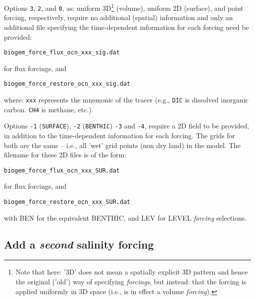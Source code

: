 \documentclass[11pt,fleqn]{book} %
\begin{document}
Options \texttt{3}, \texttt{2}, and \texttt{0}, as: uniform 3D\footnote{Note that here: '3D' does not mean a spatially explicit 3D pattern and hence the original ('old') way of specifying \textit{forcings}, but instead: that the forcing is applied uniformly in 3D space (i.e., is in effect a volume \textit{forcing}).} (volume), uniform 2D (surface), and point forcing, respectively, require no additional (spatial) information and only an additional file specifying the time-dependent information for each forcing need be provided:
\vspace{-2pt}\small\begin{verbatim}
biogem_force_flux_ocn_xxx_sig.dat
\end{verbatim}\normalsize\vspace{-2pt}
for flux forcings, and 
\vspace{-2pt}\small\begin{verbatim}
biogem_force_restore_ocn_xxx_sig.dat
\end{verbatim}\normalsize\vspace{-2pt}
where: \texttt{xxx} represents the mnemonic of the tracer (e.g., \texttt{DIC} is dissolved inorganic carbon. \texttt{CH4} is methane, etc.).

Options \texttt{-1} (\texttt{SURFACE}), \texttt{-2} (\texttt{BENTHIC}) \texttt{-3} and  \texttt{-4}, require a 2D field to be provided, in addition to the time-dependent information for each forcing. The grids for both are the same -- i.e., all 'wet' grid points (non dry land) in the model. The filename for these 2D files is of the form:
\vspace{-2pt}\small\begin{verbatim}
biogem_force_flux_ocn_xxx_SUR.dat
\end{verbatim}\normalsize\vspace{-2pt}
for flux forcings, and 
\vspace{-2pt}\small\begin{verbatim}
biogem_force_restore_ocn_xxx_SUR.dat
\end{verbatim}\normalsize\vspace{-2pt}
with \textsf{\footnotesize BEN} for the equivalent BENTHIC, and \textsf{\footnotesize LEV} for LEVEL \textit{forcing} selections.
 
%
\newpage
\subsection*{Add a \textit{second} salinity forcing}
\vspace{1mm}
\end{document}
